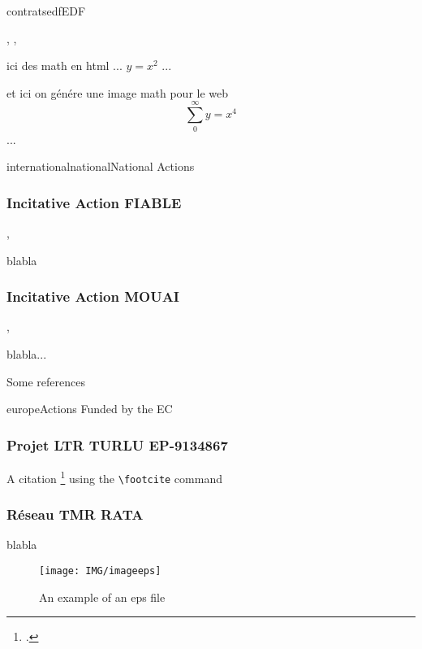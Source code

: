 \documentclass{ra2011}
\begin{document}
\begin{module}{contrats}{edf}{EDF}
\begin{participants}
, 
,
\end{participants}
ici des math en html 
... $y=x^2$ ...

et ici on génére une image math pour le web  
\begin{displaymath}
\sum_{0}^{\infty} y = x^4
\end{displaymath}
...

\end{module}



\begin{module}{international}{national}{National Actions}

\subsubsection{Incitative Action  FIABLE}
\begin{participants}
,
\end{participants}

blabla

\subsubsection{Incitative Action  MOUAI}
\begin{participants}
, 
\end{participants}

blabla...

Some references 

\end{module}


\begin{module}{}{europe}{Actions Funded by the EC}
\subsubsection{Projet LTR TURLU EP-9134867}
A citation \footcite{MB07} using the \verb=\footcite= command
\subsubsection{Réseau TMR RATA}
blabla

\begin{figure}
\begin{center}
\texttt{[image: IMG/imageeps]}
\end{center}
\caption{An example of an eps file}
\label{fig:completemap}
\end{figure}


\end{module}
\end{document}
